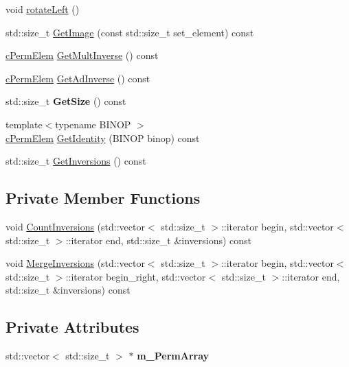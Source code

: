 \begin{DoxyCompactItemize}
\item 
void \hyperlink{classcPermElem_afa5694d1831e653f4cc3b12de6bb058e}{rotate\-Left} ()
\item 
std\-::size\-\_\-t \hyperlink{classcPermElem_adad3b042383cf3538bfec790188987c3}{\-Get\-Image} (const std\-::size\-\_\-t set\-\_\-element) const 
\item 
\hyperlink{classcPermElem}{c\-Perm\-Elem} \hyperlink{classcPermElem_adbb23b8a368e0d01cd2b450ad0be5efb}{\-Get\-Mult\-Inverse} () const 
\item 
\hyperlink{classcPermElem}{c\-Perm\-Elem} \hyperlink{classcPermElem_a11cc987f70282d2984c04c6e058c41e8}{\-Get\-Ad\-Inverse} () const 
\item 
\hypertarget{classcPermElem_a773fc9acee08d4c86d391439574eaf3e}{std\-::size\-\_\-t {\bfseries \-Get\-Size} () const }\label{classcPermElem_a773fc9acee08d4c86d391439574eaf3e}

\item 
{\footnotesize template$<$typename B\-I\-N\-O\-P $>$ }\\\hyperlink{classcPermElem}{c\-Perm\-Elem} \hyperlink{classcPermElem_a7f5392e3279b766d5f85c01d363c2941}{\-Get\-Identity} (\-B\-I\-N\-O\-P binop) const 
\item 
std\-::size\-\_\-t \hyperlink{classcPermElem_a06f75de000ad4b9524116a029800ca26}{\-Get\-Inversions} () const 
\end{DoxyCompactItemize}
\subsection*{\-Private \-Member \-Functions}
\begin{DoxyCompactItemize}
\item 
void \hyperlink{classcPermElem_abefedad75d8175a886b30a6d36a0eb98}{\-Count\-Inversions} (std\-::vector$<$ std\-::size\-\_\-t $>$\-::iterator begin, std\-::vector$<$ std\-::size\-\_\-t $>$\-::iterator end, std\-::size\-\_\-t \&inversions) const 
\item 
void \hyperlink{classcPermElem_aa39ae9f1b4d3efd38616ff822caebbb9}{\-Merge\-Inversions} (std\-::vector$<$ std\-::size\-\_\-t $>$\-::iterator begin, std\-::vector$<$ std\-::size\-\_\-t $>$\-::iterator begin\-\_\-right, std\-::vector$<$ std\-::size\-\_\-t $>$\-::iterator end, std\-::size\-\_\-t \&inversions) const 
\end{DoxyCompactItemize}
\subsection*{\-Private \-Attributes}
\begin{DoxyCompactItemize}
\item 
\hypertarget{classcPermElem_a60fc59bfe827b07c6567a3b7a5a25726}{std\-::vector$<$ std\-::size\-\_\-t $>$ $\ast$ {\bfseries m\-\_\-\-Perm\-Array}}\label{classcPermElem_a60fc59bfe827b07c6567a3b7a5a25726}

\end{DoxyCompactItemize}
